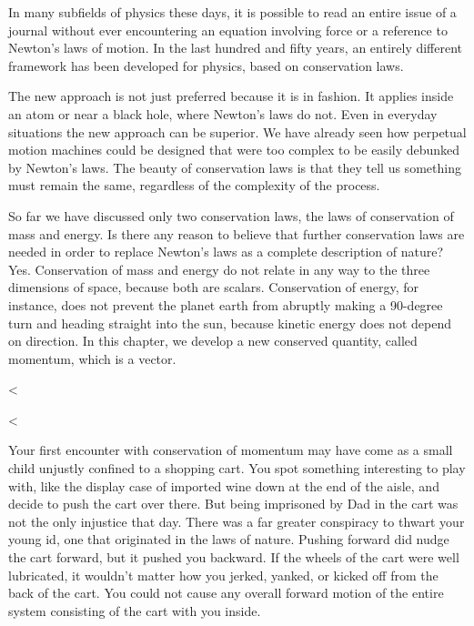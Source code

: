 In many subfields of physics these days, it is possible to
read an entire issue of a journal without ever encountering
an equation involving force or a reference to Newton's laws
of motion. In the last hundred and fifty years, an entirely
different framework has been developed for physics, based
on conservation laws.

The new approach is not just preferred because it is in
fashion. It applies inside an atom or near a black hole,
where Newton's laws do not. Even in everyday situations the
new approach can be superior. We have already seen how
perpetual motion machines could be designed that were too
complex to be easily debunked by Newton's laws. The beauty
of conservation laws is that they tell us something must
remain the same, regardless of the complexity of the process.

So far we have discussed only two conservation laws, the
laws of conservation of mass and energy. Is there any reason
to believe that further conservation laws are needed in
order to replace Newton's laws as a complete description of
nature? Yes. Conservation of mass and energy do not relate
in any way to the three dimensions of space, because both
are scalars. Conservation of energy, for instance, does not
prevent the planet earth from abruptly making a 90-degree
turn and heading straight into the sun, because kinetic
energy does not depend on direction. In this chapter, we
develop a new conserved quantity, called momentum, which is a vector.

<%

  <%

Your first encounter with conservation of momentum may have
come as a small child unjustly confined to a shopping cart.
You spot something interesting to play with, like the
display case of imported wine down at the end of the aisle,
and decide to push the cart over there. But being imprisoned
by Dad in the cart was not the only injustice that day.
There was a far greater conspiracy to thwart your young id,
one that originated in the laws of nature. Pushing forward
did nudge the cart forward, but it pushed you backward. If
the wheels of the cart were well lubricated, it wouldn't
matter how you jerked, yanked, or kicked off from the back
of the cart. You could not cause any overall forward motion
of the entire system consisting of the cart with you inside.

\enlargethispage{-4\baselineskip}

